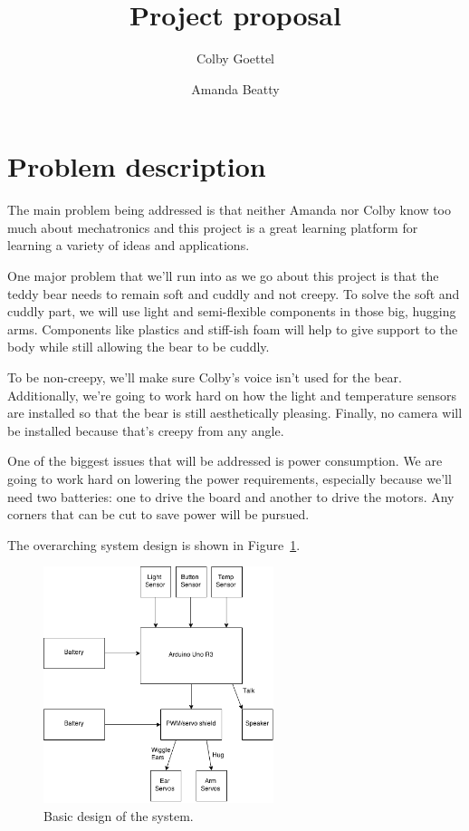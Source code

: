 \documentclass{article}
\title{Project proposal}
\author{Colby Goettel\and Amanda Beatty}
\begin{document}
\maketitle

\section{Problem description}


The main problem being addressed is that neither Amanda nor Colby know too much about mechatronics and this project is a great learning platform for learning a variety of ideas and applications.

One major problem that we'll run into as we go about this project is that the teddy bear needs to remain soft and cuddly and not creepy. To solve the soft and cuddly part, we will use light and semi-flexible components in those big, hugging arms. Components like plastics and stiff-ish foam will help to give support to the body while still allowing the bear to be cuddly.

To be non-creepy, we'll make sure Colby's voice isn't used for the bear. Additionally, we're going to work hard on how the light and temperature sensors are installed so that the bear is still aesthetically pleasing. Finally, no camera will be installed because that's creepy from any angle.

One of the biggest issues that will be addressed is power consumption. We are going to work hard on lowering the power requirements, especially because we'll need two batteries: one to drive the board and another to drive the motors. Any corners that can be cut to save power will be pursued.

The overarching system design is shown in Figure~\ref{fig:system}.

\begin{figure}[h!b]
    \centering
    \includegraphics[width=0.6\textwidth]{basic-structure}
    \caption{Basic design of the system.}
    \label{fig:system}
\end{figure}
\end{document}

